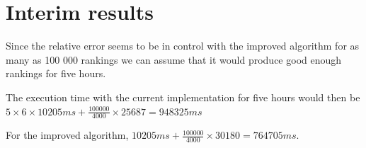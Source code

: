 \section{Interim results}

Since the relative error seems to be in control with the improved algorithm for as many as 100 000 rankings we can assume that it would produce good enough rankings for five hours.

The execution time with the current implementation for five hours would then be $5 \times 6 \times 10 205 ms + \frac{100 000}{4000} \times 25 687 = 948 325 ms$

For the improved algorithm, $10 205 ms + \frac{100 000}{4000} \times 30 180 = 764705 ms$.
